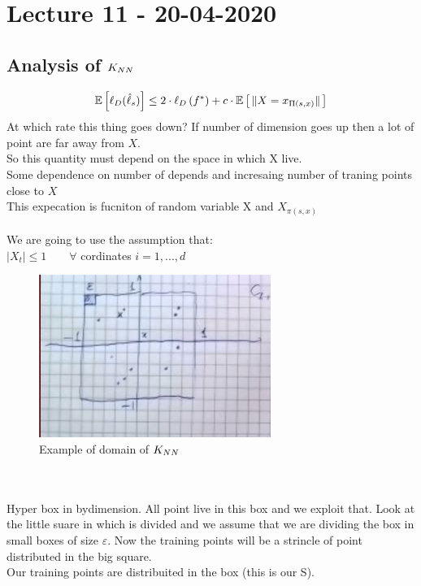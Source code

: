 \documentclass[../main.tex]{subfiles}
\begin{document}
\chapter{Lecture 11 - 20-04-2020}

\section{Analysis of $K_{NN}$}
$$
\mathbb{E} \left[{\ell_D} (\hat{\ell}_s ) \right] \leq 2 \cdot \ell_D \left( f^* \right) + c \cdot \mathbb{E}\left[ \, \| X = x_{\Pi(s,x)} \| \, \right]
$$
At which rate this thing goes down? If number of dimension goes up then a lot of point are far away from $X$. \\
So this quantity must depend on the space in which X live.
\\ Some dependence on number of depends and incresaing number of traning points close to $X$\\
This expecation is fucniton of random variable X and $X_{\pi(s,x)}$
\\\\
We are going to use the assumption that:
\\
$| X_t | \leq 1 \qquad \forall $ cordinates $i = 1, ..., d$
\\
\begin{figure}[h]
    \centering
    \includegraphics[width=0.6\linewidth]{../img/lez11-img1.JPG}
    \caption{Example of domain of $K_{NN}$}
\end{figure}\\
\\
Hyper box in bydimension. All point live in this box and we exploit that.
Look at the little suare in which is divided and we assume that we are dividing the box in small boxes of size $\varepsilon$. Now the training points will be a strincle of point distributed in the big square. \\
Our training points are distribuited in the box (this is our S).
\\
\end{document}
